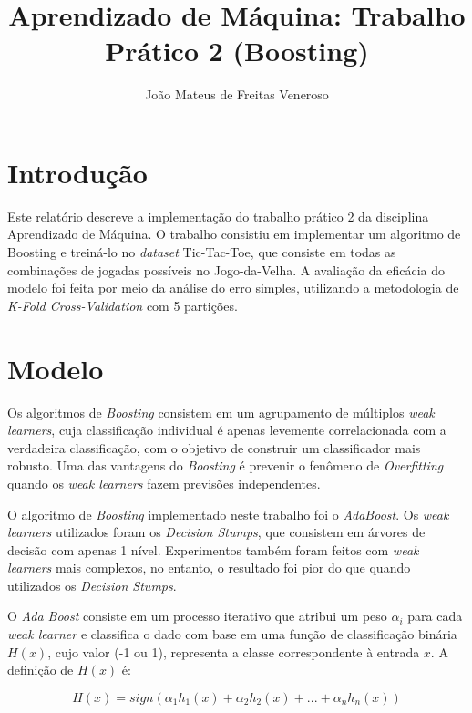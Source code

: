 \documentclass{article}
\begin{document}
\title{Aprendizado de Máquina: Trabalho Prático 2 (Boosting)}
\author{João Mateus de Freitas Veneroso}

\maketitle

\section{Introdução}

Este relatório descreve a implementação do trabalho prático 2 da disciplina Aprendizado de Máquina. 
O trabalho consistiu em implementar um algoritmo de Boosting e treiná-lo no \textit{dataset}
Tic-Tac-Toe, que consiste em todas as combinações de jogadas possíveis no Jogo-da-Velha. A
avaliação da eficácia do modelo foi feita por meio da análise do erro simples, utilizando a
metodologia de \textit{K-Fold Cross-Validation} com 5 partições.

\section{Modelo}

Os algoritmos de \textit{Boosting} consistem em um agrupamento de múltiplos \textit{weak learners},
cuja classificação individual é apenas levemente correlacionada com a verdadeira classificação, 
com o objetivo de construir um classificador mais robusto. Uma das vantagens do \textit{Boosting} é
prevenir o fenômeno de \textit{Overfitting} quando os \textit{weak learners} fazem previsões independentes.

O algoritmo de \textit{Boosting} implementado neste trabalho foi o \textit{AdaBoost}. Os \textit{weak learners} 
utilizados foram os \textit{Decision Stumps}, que consistem em árvores de decisão com apenas 1 nível.
Experimentos também foram feitos com \textit{weak learners} mais complexos, no entanto, o resultado
foi pior do que quando utilizados os \textit{Decision Stumps}.

O \textit{Ada Boost} consiste em um processo iterativo que atribui um peso $ \alpha_i $ para cada 
\textit{weak learner} e classifica o dado com base em uma função de classificação binária $ H(x) $,
cujo valor (-1 ou 1), representa a classe correspondente à entrada $ x $. A definição de $ H(x) $ é:

\[
H(x) = sign(\alpha_1h_1(x) + \alpha_2h_2(x) + ... + \alpha_nh_n(x))
\]
\end{document}

